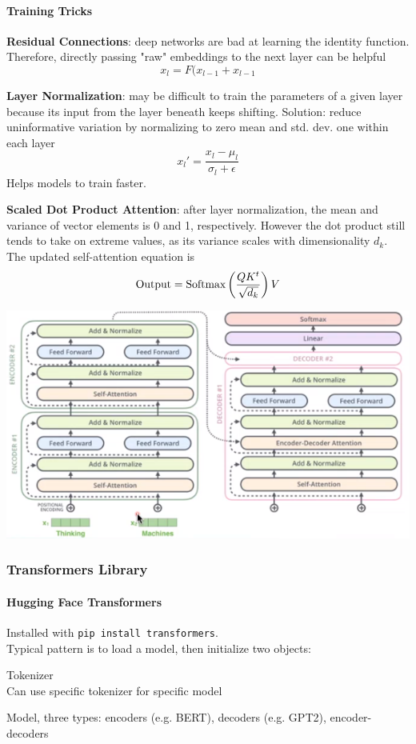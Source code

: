 \documentclass[10pt]{report}
\begin{document}
\paragraph{Training Tricks}
\begin{list}{}{}
	\item \textbf{Residual Connections}: deep networks are bad at learning the identity function. Therefore, directly passing "raw" embeddings to the next layer can be helpful
	$$x_l = F(x_{l-1} + x_{l-1}$$
	\item \textbf{Layer Normalization}: may be difficult to train the parameters of a given layer because its input from the layer beneath keeps shifting. Solution: reduce uninformative variation by normalizing to zero mean and std. dev. one within each layer
	$$x_l' = \frac{x_l - \mu_l}{\sigma_l + \epsilon}$$
	Helps models to train faster.
	\item \textbf{Scaled Dot Product Attention}: after layer normalization, the mean and variance of vector elements is 0 and 1, respectively. However the dot product still tends to take on extreme values, as its variance scales with dimensionality $d_k$. The updated self-attention equation is $$\hbox{Output} = \hbox{Softmax}\left(\frac{QK^t}{\sqrt{d_k}}\right)V$$
\end{list}
\begin{center}
	\includegraphics[scale=0.75]{73.png}
\end{center}
\subsubsection{Transformers Library}
\paragraph{Hugging Face Transformers} Installed with \texttt{pip install transformers}.\\
Typical pattern is to load a model, then initialize two objects:
\begin{list}{}{}
	\item Tokenizer\\
	Can use specific tokenizer for specific model
	\item Model, three types: encoders (e.g. BERT), decoders (e.g. GPT2), encoder-decoders
\end{list}
\end{document}
